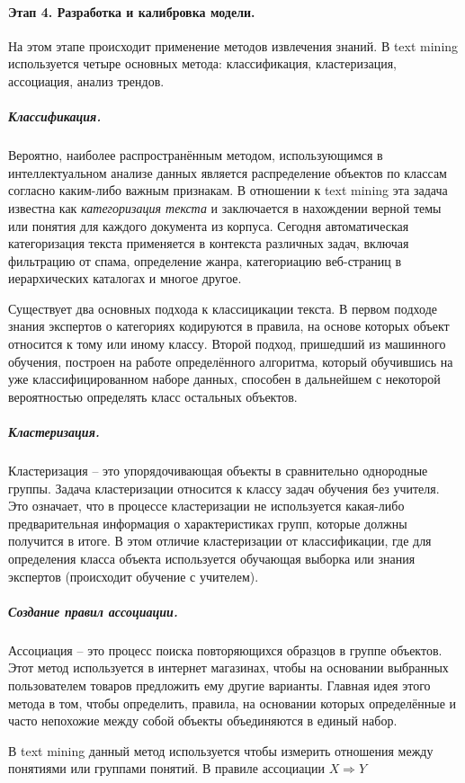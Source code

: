 	
\paragraph{Этап 4. Разработка и калибровка модели.} На этом этапе происходит применение методов извлечения знаний. В text mining используется четыре основных метода: классификация, кластеризация, ассоциация, анализ трендов.
	
	\subparagraph{Классификация.} Вероятно, наиболее распространённым методом, использующимся в интеллектуальном анализе данных является распределение объектов по классам согласно каким-либо важным признакам. В отношении к text mining эта задача известна как \textit{категоризация текста} и заключается в нахождении верной темы или понятия для каждого документа из корпуса. Сегодня автоматическая категоризация текста применяется в контекста различных задач, включая фильтрацию от спама, определение жанра, категориацию веб-страниц в иерархических каталогах и многое другое.
	
	Существует два основных подхода к классицикации текста. В первом подходе знания экспертов о категориях кодируются в правила, на основе которых объект относится к тому или иному классу. Второй подход, пришедший из машинного обучения, построен на работе определённого алгоритма, который обучившись на уже классифицированном наборе данных, способен в дальнейшем с некоторой вероятностью определять класс остальных  объектов.
	
	\subparagraph{Кластеризация.} Кластеризация -- это упорядочивающая объекты в сравнительно однородные группы. Задача кластеризации относится к классу задач обучения без учителя. Это означает, что в процессе кластеризации не используется какая-либо предварительная информация о характеристиках групп, которые должны получится в итоге. В этом отличие кластеризации от классификации, где для определения класса объекта используется обучающая выборка или знания экспертов (происходит обучение с учителем).
	
	\subparagraph{Создание правил ассоциации.} Ассоциация -- это процесс поиска повторяющихся образцов в группе объектов. Этот метод используется в интернет магазинах, чтобы на основании выбранных пользователем товаров предложить ему другие	 варианты. Главная идея этого метода в том, чтобы определить, правила, на основании которых определённые и часто непохожие между собой объекты объединяются в единый набор.
	
	В text mining данный метод используется чтобы измерить отношения между понятиями или группами понятий. В правиле ассоциации $X \Rightarrow Y$

